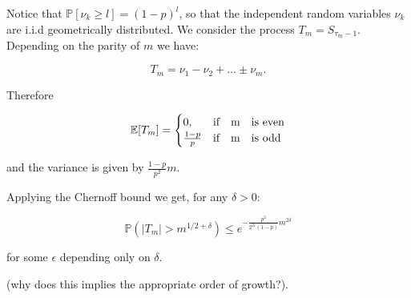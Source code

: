 \documentclass{article}
\begin{document}
Notice that $\mathbb{P}[\nu_k\geq l]=(1-p)^l$, so that the independent
random variables $\nu_k$ are i.i.d geometrically distributed. We 
consider the process $T_m=S_{\tau_m -1}$. Depending on the parity of $m$
we have:

\begin{equation}
    T_m=\nu_1-\nu_2+\ldots \pm\nu_m.
\end{equation}

Therefore

\begin{align*}
    \mathbb{E}[T_m]=
    \begin{cases}
        0, & \text{if}\quad $m$ \quad \text{is even} \\
        \frac{1-p}{p} & \text{if}\quad $m$ \quad \text{is odd}
    \end{cases}
\end{align*}

and the variance is given by $\frac{1-p}{p^2}m$.

Applying the Chernoff bound we get, for any $\delta>0:$

\begin{equation*}
    \mathbb{P}(|T_m|>m^{1/2+\delta})\leq e^{-\frac{p^2}{2^{2\epsilon}(1-p)}
    m^{2\delta}}
\end{equation*}

for some $\epsilon$ depending only on $\delta$.

(why does this implies the appropriate order of growth?).
\end{document}
